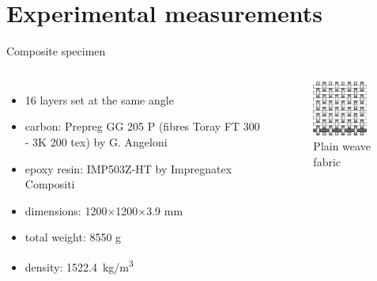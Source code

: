 \documentclass[10pt]{beamer} %
\begin{document}
\section{Experimental measurements}
\begin{frame}[t,label=frame12]{Composite specimen}
\begin{columns}[T]
	{\small
			\begin{itemize}
			\item 16 layers set at the same angle \\
			\item carbon: Prepreg GG 205  P (fibres Toray FT 300 - 3K 200 tex) by G. Angeloni 
			\item epoxy resin: IMP503Z-HT by Impregnatex Compositi 
			\item dimensions: 1200$\times$1200$\times$3.9 mm\\
			\item total weight:  8550 g
			\item density: 1522.4~kg/m\textsuperscript{3}
		\end{itemize}
	}
	\begin{figure}
		\includegraphics[width=0.9\textwidth]{weave-1.jpg}
		\caption{Plain weave fabric}
	\end{figure}
	\end{columns}
\begin{table}[h]

\end{table}
\end{frame}
\end{document}
